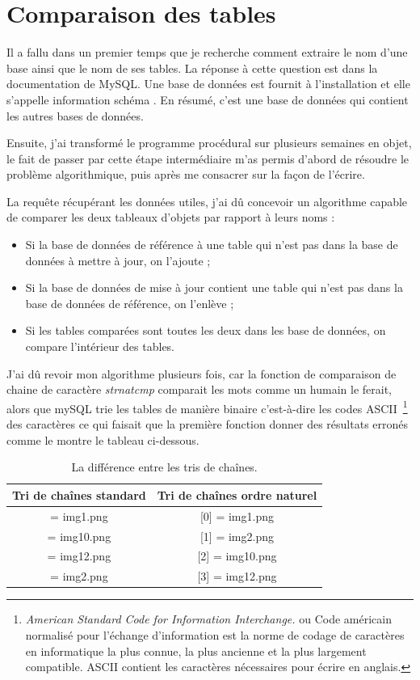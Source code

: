 \section{Comparaison des tables}


Il a fallu dans un premier temps que je recherche comment extraire le nom d'une
base ainsi que le nom de ses tables. La réponse à cette question est dans la
documentation de MySQL. Une base de données est fournit à l'installation et
elle s'appelle \og information schéma \fg{} . En résumé, c'est une base de
données qui contient les autres bases de données.

Ensuite, j'ai transformé le programme procédural sur plusieurs semaines en
objet, le fait de passer par cette étape intermédiaire m'as permis d'abord de
résoudre le problème algorithmique, puis après me consacrer sur la façon de
l'écrire.

La requête récupérant les données utiles, j'ai dû concevoir un algorithme
capable de comparer les deux tableaux d'objets par rapport à leurs noms :
\begin{itemize}
    \item Si la base de données de référence à une table qui n'est pas dans
    la base de données à mettre à jour, on l'ajoute ;
    \item Si la base de données de mise à jour contient une table qui n'est
    pas dans la base de données de référence, on l'enlève ;
    \item Si les tables comparées sont toutes les deux dans les base de
    données, on compare l'intérieur des tables.
\end{itemize}

J'ai dû revoir mon algorithme plusieurs fois, car la fonction de comparaison
de chaine de caractère \emph{strnatcmp} comparait les mots comme un humain le
ferait, alors que mySQL trie les tables de manière binaire c'est-à-dire les
codes ASCII\, \footnote{\emph{American Standard Code for Information
Interchange.} ou \og Code américain normalisé pour l'échange d'information
\fg{} est la norme de codage de caractères en informatique la plus connue, la
plus ancienne et la plus largement compatible. ASCII contient les caractères
nécessaires pour écrire en anglais.} des caractères ce qui faisait que la
première fonction donner des résultats erronés comme le montre le tableau
ci-dessous.

\begin{table}
\begin{center}
\begin{tabular}{|c|c|}
\hline
\textbf{Tri de chaînes standard} & \textbf{Tri de chaînes ordre naturel} \\
\hline
[0] = img1.png & [0] = img1.png \\
\hline
[1] = img10.png & [1] = img2.png \\
\hline
[2] = img12.png & [2] = img10.png \\
\hline
[3] = img2.png & [3] = img12.png \\
\hline
\end{tabular}
\caption{La différence entre les tris de chaînes.}
\end{center}
\end{table}

